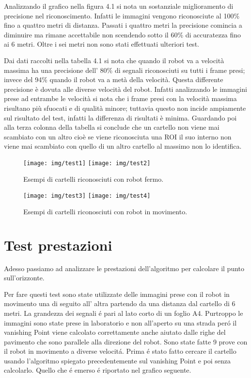 	Analizzando il grafico nella figura 4.1 si nota un sostanziale miglioramento di precisione nel riconoscimento. Infatti le immagini vengono riconosciute al 100\% fino a quattro metri di distanza. Passati i quattro metri la precisione comincia a diminuire ma rimane accettabile non scendendo sotto il 60\%  di accuratezza fino ai 6 metri. Oltre i sei metri non sono stati effettuati ulteriori test.

	Dai dati raccolti nella tabella 4.1 si nota che quando il robot va a velocità massima ha una precisione dell' 80\% di segnali riconosciuti su tutti i frame presi; invece del 94\% quando il robot va a metà della velocità. Questa differente precisione è dovuta alle diverse velocità del robot. Infatti analizzando le immagini prese ad entrambe le velocità si nota che i frame presi con la velocità massima risultano più sfuocati e di qualità minore; tuttavia questo non incide ampiamente sul risultato del test, infatti la differenza di risultati è minima. Guardando poi alla terza colonna della tabella si conclude che un cartello non viene mai scambiato con un altro cioè se viene riconosciuta una ROI il suo interno non viene mai scambiato con quello di un altro cartello al massimo non lo identifica.

	\begin{figure}[!ht]
		\centering
		\texttt{[image: img/test1]}
		\texttt{[image: img/test2]}
		\caption[Riconoscimento immagini robot fermo]{Esempi di cartelli riconosciuti con robot fermo.}
	\end{figure}

	\begin{figure}[!ht]
		\centering
		\texttt{[image: img/test3]}
		\texttt{[image: img/test4]}
		\caption[Riconoscimento immagini robot in movimento]{Esempi di cartelli riconosciuti con robot in movimento.}
	\end{figure}

\section{Test prestazioni}

	Adesso passiamo ad analizzare le prestazioni dell'algoritmo per calcolare il punto sull'orizzonte.

	Per fare questi test sono state utilizzate delle immagini prese con il robot in movimento una di seguito all' altra partendo da una distanza dal cartello di 6 metri. La grandezza dei segnali \'e pari al lato corto di un foglio A4. Purtroppo le immagini sono state prese in laboratorio e non all'aperto su una strada per\'o il vanishing Point viene calcolato correttamente anche aiutato dalle righe del pavimento che sono parallele alla direzione del robot. Sono state fatte 9 prove con il robot in movimento a diverse velocit\'a. Prima \'e stato fatto cercare il cartello usando l'algoritmo spiegato precedentemente sul vanishing Point e poi senza calcolarlo. Quello che \'e emerso \'e riportato nel grafico seguente.

